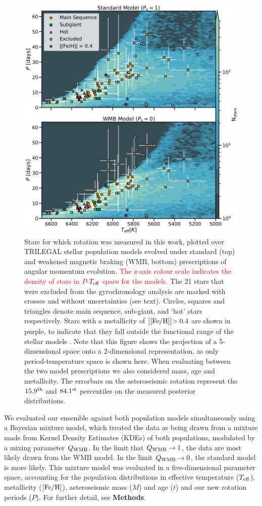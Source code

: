 \documentclass[12pt]{article}
\newcommand{\teff}{\mbox{$T_{\rm eff}$}\xspace}
\newcommand{\feh}{\mbox{$\rm{[Fe/H]}$}\xspace}
\newcommand{\rtwo}[1]{\textcolor{red}{{#1}}}
\begin{document}
\begin{figure}
	\centering
	\includegraphics[width=.9\textwidth]{fullsample.png}
	\caption{Stars for which rotation was measured in this work, plotted over TRILEGAL \cite{girardi+2012} stellar population models evolved under standard (top) and weakened magnetic braking (WMB, bottom) prescriptions of angular momentum evolution. \rtwo{The z-axis colour scale indicates the density of stars in $P$-\teff space for the models.} The 21 stars that were excluded from the gyrochronology analysis are marked with crosses and without uncertainties (see text). Circles, squares and triangles denote main sequence, sub-giant, and `hot' stars respectively. Stars with a metallicity of $\bigl\lvert \feh \bigl\rvert > 0.4$ are shown in purple, to indicate that they fall outside the functional range of the stellar models  \cite{vansaders+2019}. Note that this figure shows the projection of a 5-dimensional space onto a 2-dimensional representation, as only period-temperature space is shown here. When evaluating between the two model prescriptions we also considered mass, age and metallicity. The errorbars on the asteroseismic rotation represent the $15.9^{\rm th}$ and $84.1^{\rm st}$ percentiles on the measured posterior distributions.}
	\label{fig:fullsample}
\end{figure}

We evaluated our ensemble against both population models simultaneously using a Bayesian mixture model, which treated the data as being drawn from a mixture made from Kernel Density Estimates (KDEs) of both populations, modulated by a mixing parameter $Q_{\rm WMB}$. In the limit that $Q_{\rm WMB} \rightarrow 1$, the data are most likely drawn from the WMB model. In the limit $Q_{\rm WMB} \rightarrow 0$, the standard model is more likely. This mixture model was evaluated in a five-dimensional parameter space, accounting for the population distributions in effective temperature ($T_{\rm eff}$), metallicity (\feh), asteroseismic mass ($M$) and age ($t$) and our new rotation periods ($P$). For further detail, see \textbf{Methods}.\\
\end{document}
